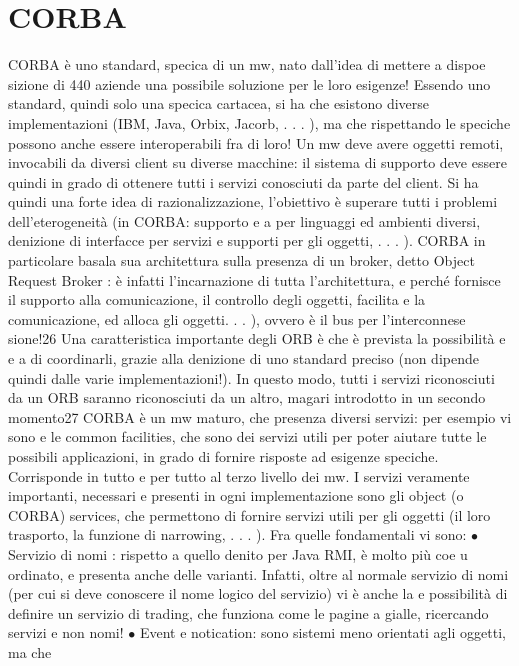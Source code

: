 \section{CORBA}
CORBA è uno standard, specica di un mw, nato dall'idea di mettere a dispoe
sizione di 440 aziende una possibile soluzione per le loro esigenze!
Essendo uno standard, quindi solo una specica cartacea, si ha che esistono
diverse implementazioni (IBM, Java, Orbix, Jacorb, . . . ), ma che rispettando le
speciche possono anche essere interoperabili fra di loro!
Un mw deve avere oggetti remoti, invocabili da diversi client su diverse macchine: il sistema di supporto deve essere
quindi in grado di ottenere tutti i servizi
conosciuti da parte del client. Si ha quindi una forte idea di razionalizzazione,
l'obiettivo è superare tutti i problemi dell'eterogeneità (in CORBA: supporto
e
a
per linguaggi ed ambienti diversi, denizione di interfacce per servizi e supporti
per gli oggetti, . . . ).
CORBA in particolare basala sua architettura sulla presenza di un broker,
detto Object Request Broker : è infatti l'incarnazione di tutta l'architettura,
e
perché fornisce il supporto alla comunicazione, il controllo degli oggetti, facilita
e
la comunicazione, ed alloca gli oggetti. . . ), ovvero è il bus per l'interconnese
sione!26 Una caratteristica importante degli ORB è che è prevista la possibilità
e
e
a
di coordinarli, grazie alla denizione di uno standard preciso (non dipende quindi dalle varie implementazioni!). In
questo modo, tutti i servizi riconosciuti da
un ORB saranno riconosciuti da un altro, magari introdotto in un secondo
momento27
CORBA è un mw maturo, che presenza diversi servizi: per esempio vi sono
e
le common facilities, che sono dei servizi utili per poter aiutare tutte le possibili
applicazioni, in grado di fornire risposte ad esigenze speciche. Corrisponde in
tutto e per tutto al terzo livello dei mw.
I servizi veramente importanti, necessari e presenti in ogni implementazione
sono gli object (o CORBA) services, che permettono di fornire servizi utili per gli
oggetti (il loro trasporto, la funzione di narrowing, . . . ). Fra quelle fondamentali
vi sono:
$\bullet$ Servizio di nomi : rispetto a quello denito per Java RMI, è molto più coe
u
ordinato, e presenta anche delle varianti. Infatti, oltre al normale servizio
di nomi (per cui si deve conoscere il nome logico del servizio) vi è anche la
e
possibilità di definire un servizio di trading, che funziona come le pagine
a
gialle, ricercando servizi e non nomi!
$\bullet$ Event e notication: sono sistemi meno orientati agli oggetti, ma che
